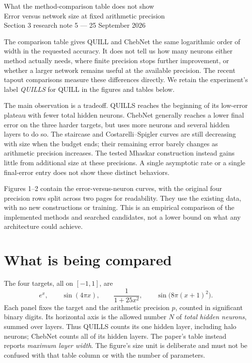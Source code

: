 \documentclass[11pt]{article}
\begin{document}
\begin{center}
{\Large What the method-comparison table does not show}\\[4pt]
{\normalsize Error versus network size at fixed arithmetic precision}\\[6pt]
{\small Section 3 research note 5 --- 25 September 2026}
\end{center}
\vspace{0.5em}

The comparison table gives QUILL and ChebNet the same logarithmic order of width in the requested accuracy. It does not tell us how many neurons either method actually needs, where finite precision stops further improvement, or whether a larger network remains useful at the available precision. The recent tapout comparisons measure these differences directly. We retain the experiment's label \emph{QUILLS} for QUILL in the figures and tables below.

The main observation is a tradeoff. QUILLS reaches the beginning of its low-error plateau with fewer total hidden neurons. ChebNet generally reaches a lower final error on the three harder targets, but uses more neurons and several hidden layers to do so. The staircase and Costarelli--Spigler curves are still decreasing with size when the budget ends; their remaining error barely changes as arithmetic precision increases. The tested Mhaskar construction instead gains little from additional size at these precisions. A single asymptotic rate or a single final-error entry does not show these distinct behaviors.

Figures 1--2 contain the error-versus-neuron curves, with the original four precision rows split across two pages for readability. They use the existing data, with no new constructions or training. This is an empirical comparison of the implemented methods and searched candidates, not a lower bound on what any architecture could achieve.

\section{What is being compared}

The four targets, all on \([-1,1]\), are
\[
e^x,\qquad \sin(4\pi x),\qquad \frac{1}{1+25x^2},\qquad
\sin\!\bigl(8\pi(x+1)^2\bigr).
\]
Each panel fixes the target and the arithmetic precision \(p\), counted in significant binary digits. Its horizontal axis is the allowed number \(N\) of \emph{total hidden neurons}, summed over layers. Thus QUILLS counts its one hidden layer, including halo neurons; ChebNet counts all of its hidden layers. The paper's table instead reports \emph{maximum layer width}. The figure's size unit is deliberate and must not be confused with that table column or with the number of parameters.
\end{document}

